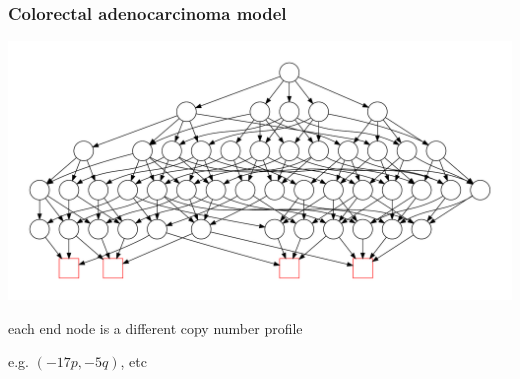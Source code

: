 \documentclass{beamer}
\begin{document}
\begin{frame}
    \frametitle{Colorectal adenocarcinoma model}
    \begin{center}
        \includegraphics[width=1.0\textwidth]{figures/diagram6}
    \end{center}


    \begin{center}
        \small{each end node is a different copy number profile}

        \;

        \small{e.g. $(-17p, -5q)$, etc}
    \end{center}
\end{frame}
\end{document}
